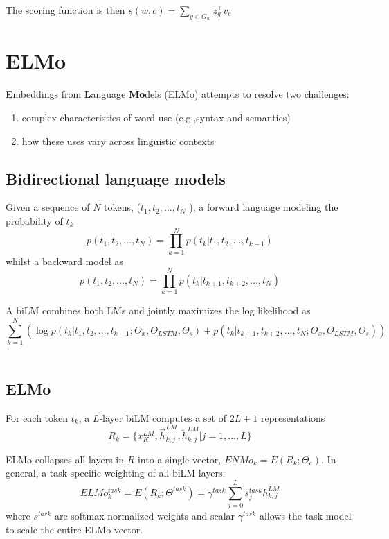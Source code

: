 \documentclass[a3paper, 12pt]{book} %
\begin{document}
The scoring function is then $s(w,c)=\sum_{g\in G_w}{z_g^{\top}v_c}$ 


\section{ELMo}
\textbf{E}mbeddings from \textbf{L}anguage \textbf{Mo}dels (ELMo) \citep{peters2018deep} attempts to resolve two challenges:
\begin{enumerate}
	\item complex characteristics of word use (e.g.,syntax and semantics)
	\item how these uses vary across linguistic contexts \\
\end{enumerate} 

\subsection{Bidirectional language models}

Given a sequence of $N$ tokens, ($t_1, t_2 , ..., t_N$ ), a forward language modeling the probability of $t_k$
$$p(t_1,t_2,...,t_N)=\prod_{k=1}^{N}{p(t_k|t_1,t_2,...,t_{k-1})}$$
whilst a backward model as 
$$p(t_1,t_2,...,t_N)=\prod_{k=1}^{N}{p(t_k|t_{k+1},t_{k+2},...,t_{N})}$$

A biLM combines both LMs and jointly maximizes the log likelihood as 
$$\sum_{k=1}^{N}{(\log{p(t_k|t_1,t_2,...,t_{k-1};\Theta_x,\Theta_{LSTM},\Theta_{s}) + p(t_k|t_{k+1},t_{k+2},...,t_{N};\Theta_x, \Theta_{LSTM},\Theta_s)})}$$ \\


\subsection{ELMo}

For each token $t_k$, a $L$-layer biLM computes a set of $2L+1$ representations
$$R_k = \{x_K^{LM}, \overrightarrow{h}_{k,j}^{LM}, \overleftarrow{h}_{k,j}^{LM} |j=1,...,L\}$$

ELMo collapses all layers in $R$ into a single vector, $ENMo_k=E(R_k;\Theta_{e})$.
In general, a task specific weighting of all biLM layers: 
$$ELMo_{k}^{task}=E(R_k;\Theta^{task})=\gamma^{task}\sum_{j=0}^{L}{s_j^{task}h_{k,j}^{LM}}$$
where $s^{task}$ are softmax-normalized weights and scalar $\gamma^{task}$ allows the task model to scale the entire ELMo vector.
\end{document}
